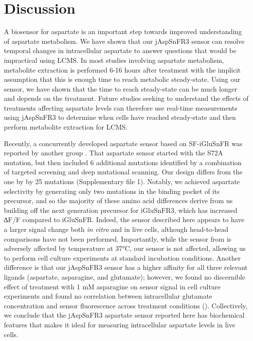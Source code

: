 \documentclass[9pt,lineno]{elife}
\begin{document}
\section{Discussion}
A biosensor for aspartate is an important step towards improved understanding of aspartate metabolism.
We have shown that our jAspSnFR3 sensor can resolve temporal changes in intracellular aspartate to answer questions that would be impractical using LCMS.
In most studies involving aspartate metabolism, metabolite extraction is performed 6-16 hours after treatment with the implicit assumption that this is enough time to reach metabolic steady-state.
Using our sensor, we have shown that the time to reach steady-state can be much longer and depends on the treatment.
Future studies seeking to understand the effects of treatments affecting aspartate levels can therefore use real-time measurements using jAspSnFR3 to determine when cells have reached steady-state and then perform metabolite extraction for LCMS.

Recently, a concurrently developed aspartate sensor based on SF-iGluSnFR was reported by another group \citep{Hellweg2023}.
That aspartate sensor started with the S72A mutation, but then included 6 additional mutations identified by a combination of targeted screening and deep mutational scanning.
Our design differs from the one by \cite{Hellweg2023} by 25 mutations (Supplementary file 1).
Notably, we achieved aspartate selectivity by generating only two mutations in the binding pocket of its precursor, and so the majority of these amino acid differences derive from us building off the next generation precursor for iGluSnFR3, which has increased ∆F/F compared to iGluSnFR.
Indeed, the sensor described here appears to have a larger signal change both \textit{in vitro} and in live cells, although head-to-head comparisons have not been performed.
Importantly, while the sensor from \cite{Hellweg2023} is adversely affected by temperature at 37°C, our sensor is not affected, allowing us to perform cell culture experiments at standard incubation conditions.
Another difference is that our jAspSnFR3 sensor has a higher affinity for all three relevant ligands (aspartate, asparagine, and glutamate); however, we found no discernible effect of treatment with 1 mM asparagine on sensor signal in cell culture experiments and found no correlation between intracellular glutamate concentration and sensor fluorescence across treatment conditions ().
Collectively, we conclude that the jAspSnFR3 aspartate sensor reported here has biochemical features that makes it ideal for measuring intracellular aspartate levels in live cells.
\end{document}
